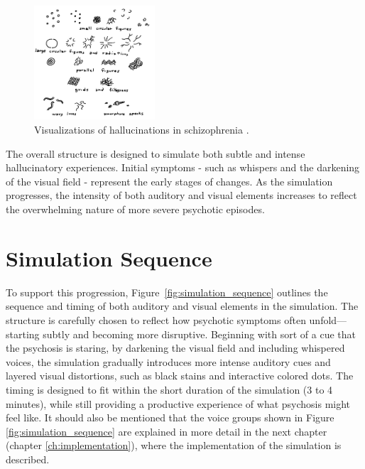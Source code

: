 \begin{figure}[h!] 
    \centering 
    \includegraphics[width=0.4\textwidth]{../../Figures/hallucinations-visual.jpg} 
    \caption{Visualizations of hallucinations in schizophrenia \cite{Horowitz1964}.} 
    \label{fig:visualizations_hallucinations} 
\end{figure}


The overall structure is designed to simulate both subtle and intense hallucinatory experiences. Initial symptoms - such as whispers and the darkening of the visual field - represent the early stages of changes. As the simulation progresses, the intensity of both auditory and visual elements increases to reflect the overwhelming nature of more severe psychotic episodes. 

\section{Simulation Sequence}

To support this progression, Figure~\ref{fig:simulation_sequence} outlines the sequence and timing of both auditory and visual elements in the simulation. The structure is carefully chosen to reflect how psychotic symptoms often unfold—starting subtly and becoming more disruptive. Beginning with sort of a cue that the psychosis is staring, by darkening the visual field and including whispered voices, the simulation gradually introduces more intense auditory cues and layered visual distortions, such as black stains and interactive colored dots. The timing is designed to fit within the short duration of the simulation (3 to 4 minutes), while still providing a productive experience of what psychosis might feel like. It should also be mentioned that the voice groups shown in Figure \ref{fig:simulation_sequence} are explained in more detail in the next chapter (chapter \ref{ch:implementation}), where the implementation of the simulation is described.

